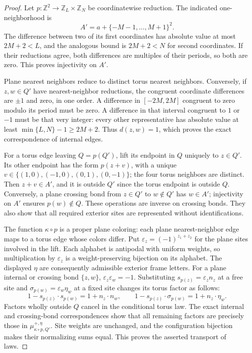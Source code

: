 \begin{proof}
Let \(p:\mathbb Z^2\to\mathbb Z_L\times\mathbb Z_N\) be
coordinatewise reduction. The indicated one-neighborhood is
\[
 A'=a+\{-M-1,\ldots,M+1\}^2.
\]
The difference between two of its first coordinates has absolute
value at most \(2M+2<L\), and the analogous bound is
\(2M+2<N\) for second coordinates. If their reductions agree,
both differences are multiples of their periods, so both are zero.
This proves injectivity on \(A'\).

Plane nearest neighbors reduce to distinct torus nearest neighbors.
Conversely, if \(z,w\in Q'\) have nearest-neighbor reductions,
the congruent coordinate differences are \(\pm1\) and zero,
in one order. A difference in \([-2M,2M]\) congruent to zero
modulo its period must be zero. A difference in that interval
congruent to \(1\) or \(-1\) must be that very integer:
every other representative has absolute value at least
\(\min\{L,N\}-1\ge2M+2\). Thus \(d(z,w)=1\), which
proves the exact correspondence of internal edges.

For a torus edge leaving \(Q=p(Q')\), lift its endpoint in \(Q\)
uniquely to \(z\in Q'\). Its other endpoint has the form
\(p(z+v)\), with a unique
\(v\in\{(1,0),(-1,0),(0,1),(0,-1)\}\); the four torus
neighbors are distinct. Then \(z+v\in A'\), and it is outside
\(Q'\) since the torus endpoint is outside \(Q\).
Conversely, a plane crossing bond from \(z\in Q'\) to
\(w\notin Q'\) has \(w\in A'\); injectivity on \(A'\)
ensures \(p(w)\notin Q\). These operations are inverse on
crossing bonds. They also show that all required exterior sites
are represented without identifications.

The function \(\kappa\circ p\) is a proper plane coloring:
each plane nearest-neighbor edge maps to a torus edge whose
colors differ. Put \(\varepsilon_z=(-1)^{z_1+z_2}\) for the
plane sites involved in the lift. Each alphabet is antipodal with
uniform weights, so multiplication by \(\varepsilon_z\) is a
weight-preserving bijection on its alphabet. The displayed \(\eta\)
are consequently admissible exterior frame letters.
For a plane internal or crossing bond \(\{z,w\}\),
\(\varepsilon_z\varepsilon_w=-1\). Substituting
\(s_{p(z)}=\varepsilon_z n_z\) at a free site and
\(\sigma_{p(w)}=\varepsilon_w\eta_w\) at a fixed site changes
its torus factor as follows:
\[
 1-s_{p(z)}\cdot s_{p(w)}=1+n_z\cdot n_w,
 \qquad
 1-s_{p(z)}\cdot\sigma_{p(w)}=1+n_z\cdot\eta_w.
\]
Factors wholly outside \(Q\) cancel in the conditional torus
law. The exact internal and crossing-bond correspondences show
that all remaining factors are precisely those in
\(\mu^{+,\eta}_{\kappa\circ p,Q'}\). Site weights are unchanged,
and the configuration bijection makes their normalizing sums
equal. This proves the asserted transport of laws.


\end{proof}
